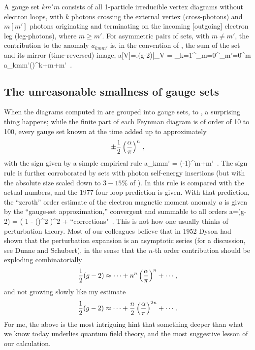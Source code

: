 A gauge set $km'm$ consists of all 1-particle irreducible vertex
diagrams without electron loops, with $k$ photons crossing the external
vertex (cross-photons) and $m [m']$ photons originating and terminating
on the incoming [outgoing] electron leg (leg-photons), where $m\geq m'$.
For asymmetric pairs of sets, with $m\neq m'$, the contribution to the
anomaly $a_{kmm'}$ is, in the convention of , the sum of
the set and its mirror (time-reversed) image,
\beq
a[V]=\left.(g-2)\right|_V
       =  \sum_{k=1}^\infty\sum_{m=0}^\infty\sum_{m'=0}^m
          a_{kmm'}\left(\frac{\alpha}{\pi}\right)^{k+m+m'}
\,.

\subsection{The unreasonable smallness of gauge sets}
\label{sect:gaugeSetsSmall}

When the diagrams computed in  are grouped into
gauge sets,  to ,
a surprising thing happens; while the
finite part of each Feynman diagram is of order of 10 to 100, every
 gauge set known at the time added up to approximately
$$
		   \pm {1 \over 2} \left(\frac{\alpha}{\pi}\right)^n
\,,
$$
with the sign given by a simple empirical rule
\beq
a_{kmm'} = (-1)^{m+m'}
\,.
The sign rule is further corroborated by sets with photon
self-energy insertions (but with the absolute size scaled down to
$3-15\%$ of ).
In  this rule is compared with the actual numbers,
and the 1977 four-loop prediction is given.
With that prediction, the ``zeroth'' order estimate of the electron
magnetic moment anomaly $a$ is given by the ``gauge-set
approximation,'' convergent and summable to all orders
\beq
a=(g-2) =   \frac{\alpha}{\pi}
           {\left( 1 - \left(\frac{\alpha}{\pi}\right)^2
			\right)^2
		      } + \mbox{``corrections"}
\,.
This is not how one usually thinks of perturbation theory. Most of our
colleagues believe that in 1952 Dyson had  shown that the
perturbation expansion is an asymptotic series (for a discussion, see
Dunne and Schubert), in the sense that the $n$-th order
contribution should be exploding combinatorially
$$
{1 \over 2} (g-2) \approx
\cdots + n^n \left(\frac{\alpha}{\pi}\right)^n + \cdots
\,,
$$
and not growing slowly like my estimate
\[
{1 \over 2} (g-2) \approx
\cdots + \frac{n}{2}\left(\frac{\alpha}{\pi}\right)^{2n} + \cdots
\,.
\]
For me, the above is the most intriguing hint that something deeper than
what we know today underlies quantum field theory, and the most suggestive
lesson of our calculation.

